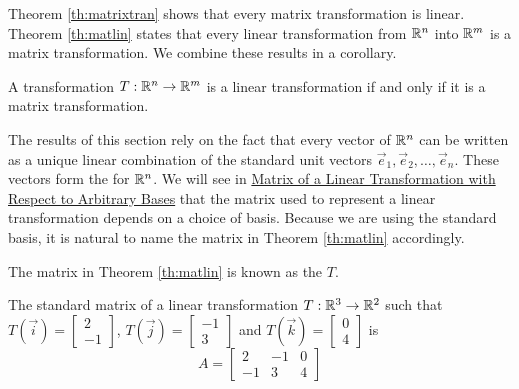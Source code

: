 \documentclass{ximera}
\begin{document}
Theorem \ref{th:matrixtran} shows that every matrix transformation is linear.  Theorem \ref{th:matlin} states that every linear transformation from $\mathbb{R}^n$ into $\mathbb{R}^m$ is a matrix transformation.  We combine these results in a corollary.

  \begin{corollary}\label{cor:lintransmattrans} A transformation $T:\mathbb{R}^n\rightarrow\mathbb{R}^m$ is a linear transformation if and only if it is a matrix transformation.
\end{corollary}  

The results of this section rely on the fact that every vector of $\mathbb{R}^n$ can be written as a unique linear combination of the standard unit vectors $\vec{e}_1,\vec{e}_2,\dots,\vec{e}_n$.  These vectors form the  for $\mathbb{R}^n$.  We will see in \href{https://ximera.osu.edu/oerlinalg/LinearAlgebra/LTR-0080/main}{Matrix of a Linear Transformation with Respect to Arbitrary Bases} that the matrix used to represent a linear transformation depends on a choice of basis.  Because we are using the standard basis, it is natural to name the matrix in Theorem \ref{th:matlin} accordingly.

\begin{definition} \label{def:standardmatoflintrans}
  
The matrix in Theorem \ref{th:matlin} is known as the  $T$.
  
\end{definition}





 \begin{example}\label{ex:findmatrix2}
 The standard matrix of a linear transformation $T:\mathbb{R}^3\rightarrow \mathbb{R}^2$ such that $T(\vec{i})=\begin{bmatrix}2\\-1\end{bmatrix}$, $T(\vec{j})=\begin{bmatrix}-1\\3\end{bmatrix}$ and $T(\vec{k})=\begin{bmatrix}0\\4\end{bmatrix}$ is
 $$A=\begin{bmatrix}2&-1&0\\-1&3&4\end{bmatrix}$$
 \end{example}
 
\end{document}
